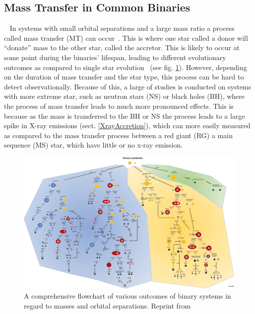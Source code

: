 \documentclass[12pt, a4paper]{article}
\begin{document}
    \subsection{Mass Transfer in Common Binaries}~\label{MassTransferinCommon}
    In systems with small orbital separations and a large mass ratio a process called mass transfer (MT) can occur~\parencite{TaurisvandenHeuvel+2023}. This is where one star called a donor will ``donate'' mass to the other star, called the accretor. This is likely to occur at some point during the binaries' lifespan, leading to different evolutionary outcomes as compared to single star evolution~\parencite{TaurisvandenHeuvel+2023} (see fig. \ref{fig:binary_evolution_flowchart}). However, depending on the duration of mass transfer and the star type, this process can be hard to detect observationally. Because of this, a large of studies is conducted on systems with more extreme star, such as neutron stars (NS) or black holes (BH), where the process of mass transfer leads to much more pronounced effects. This is because as the mass is transferred to the BH or NS the process leads to a large spike in X-ray emissions (sect. \ref{XrayAccretion}), which can more easily measured as compared to the mass transfer process between a red giant (RG) a main sequence (MS) star, which have little or no x-ray emission. 

    \vspace*{\fill}
    \begin{figure}[H]
        \centering
        \includegraphics[width=\textwidth]{figs/Binary Evolution Flowchart.jpg}
        \caption{A comprehensive flowchart of various outcomes of binary systems in regard to masses and orbital separations. Reprint from \parencite{Chen_2024}}
        \label{fig:binary_evolution_flowchart}
    \end{figure}
    \vspace*{\fill}
    \restoregeometry
\end{document}
